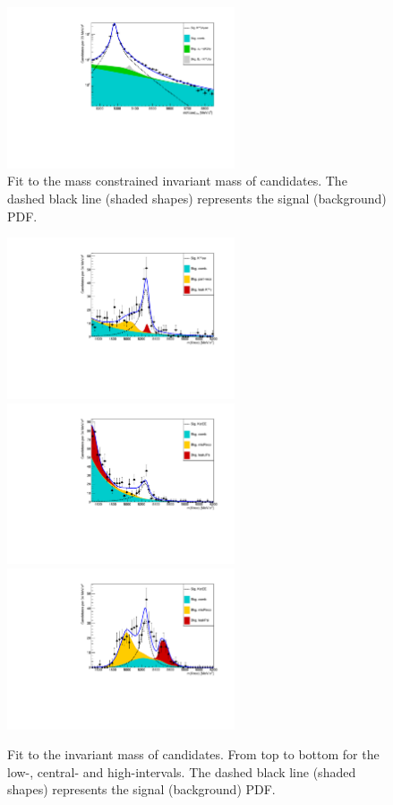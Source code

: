 \begin{figure}[h!]
\centering
\includegraphics[width=0.6\textwidth]{RKst/figs/Fit/fit_EE/fit_JPs_L_log.pdf}
\caption{Fit to the mass constrained \mKpiee invariant mass of \BdToKstJPsee candidates.
The dashed black line (shaded shapes) represents the signal (background) PDF.}
\label{fig:fitJPsEE}
\end{figure}
%
\begin{figure}[h!]
\centering
\includegraphics[width=0.6\textwidth]{RKst/figs/Fit/fit_EE/fit_EEl.pdf}
\includegraphics[width=0.6\textwidth]{RKst/figs/Fit/fit_EE/fit_EEc.pdf}
\includegraphics[width=0.6\textwidth]{RKst/figs/Fit/fit_EE/fit_EEh.pdf}
\caption{Fit to the \mKpiee invariant mass of \BdToKstee candidates. From top to bottom for the low-, central-
and high-\qsq intervals. The dashed black line (shaded shapes) represents the signal (background) PDF.}
\label{fig:fitsEE}
\end{figure}
